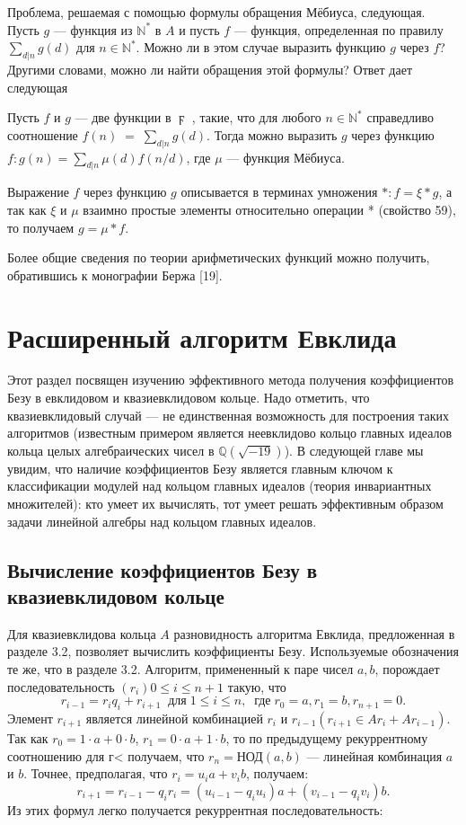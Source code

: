 Проблема, решаемая с помощью формулы обращения Мёбиуса, следующая. Пусть $g$ — функция из $\mathbb{N}^*$ в $A$ и пусть $f$ — функция, определенная по правилу $\sum\nolimits_{d|n}g(d)$ для $n\in\mathbb{N}^*$. Можно ли в этом случае выразить функцию $g$ через $f$? Другими словами, можно ли найти обращения этой формулы? Ответ дает следующая
\begin{thm}
\hspace{0.5cm}Пусть $f$ и $g$ — две функции в $\digamma$ , такие, что для любого $n\in\mathbb{N}^*$ справедливо соотношение $f(n)\;=\;\sum\nolimits_{d|n}g(d)$. Тогда можно выразить $g$
через функцию $f: g(n)=\sum\nolimits_{d|n}\mu(d)f(n/d)$, где $\mu$ — функция Мёбиуса.
\end{thm}
\newpage
\begin{myproof}
Выражение $f$ через функцию $g$ описывается в терминах умножения
$*: f = \xi*g$, а так как $\xi$ и $\mu$ взаимно простые элементы относительно
 операции * (свойство 59), то получаем $g= \mu*f$.
\end{myproof}

Более общие сведения по теории арифметических функций можно
получить, обратившись к монографии Бержа [19].
\section{Расширенный алгоритм Евклида}
\noindent Этот раздел посвящен изучению эффективного метода получения ко­эффициентов Безу в евклидовом и квазиевклидовом кольце. Надо от­метить, что квазиевклидовый случай — не единственная возможность
для построения таких алгоритмов (известным примером является не­евклидово кольцо главных идеалов кольца целых алгебраических чисел
в $\mathbb{Q}(\sqrt{-19})$). В следующей главе мы увидим, что наличие коэффициен­тов Безу является главным ключом к классификации модулей над кольцом главных идеалов (теория инвариантных множителей): кто умеет их
вычислять, тот умеет решать эффективным образом задачи линейной
алгебры над кольцом главных идеалов.
\subsection{Вычисление коэффициентов Безу
в квазиевклидовом кольце}
\noindent Для квазиевклидова кольца $A$ разновидность алгоритма Евклида, пред­ложенная в разделе 3.2, позволяет вычислить коэффициенты Безу. Ис­пользуемые обозначения те же, что в разделе 3.2. Алгоритм, приме­ненный к паре чисел $a,b$, порождает последовательность $(r_{i}){0\leqslant i\leqslant n+1}$ такую, что
$$r_{i-1}=r_{i}q_{i}+r_{i+1}\;\;\text{для}\;1\leqslant i\leqslant n,\;\;\text{где}\;r_{0}=a,r_{1}=b,r_{n+1}=0.$$
Элемент $r_{i+1}$ является линейной комбинацией $r_{i}$ и $r_{i-1} (r_{i+1}\in Ar_{i}+Ar_{i-1})$. Так как $r_{0}=1\cdot a+0\cdot b$, $r_{1}=0\cdot a+1\cdot b$, то по предыдущему
рекуррентному соотношению для г< получаем, что $r_{n} = \text{НОД}(a,b)$ — линейная комбинация $a$ и $b$. Точнее, предполагая, что $r_{i}=u_{i}a+v_{i}b$, получаем:
$$r_{i+1}=r_{i-1}-q_{i}r_{i}=(u_{i-1}-q_{i}u_{i})a+(v_{i-1}-q_{i}v_{i})b.$$
\newpage
\noindent Из этих формул легко получается рекуррентная последовательность:

